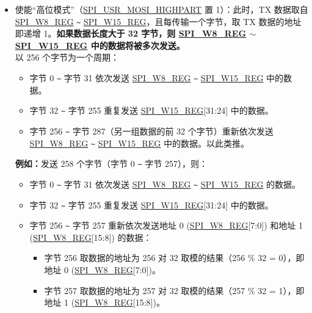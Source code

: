 \documentclass[main\_\_CN.tex]{subfiles}
\begin{document}
\begin{itemize}
\begin{itemize}
\begin{itemize}
\begin{itemize}
                    \item 字节 257 取数据的地址为 257 对 64 取模的结果（257 \% 64 = 1），即地址 1 (\hyperref[regdesc:SPIW0REG]{SPI\_W0\_REG}[15:8])。
                \end{itemize}
        \end{itemize}
        \item 使能“高位模式”（\hyperref[fielddesc:SPIUSRMOSIHIGHPART]{SPI\_USR\_MOSI\_HIGHPART} 置 1）：此时，TX 数据取自 \hyperref[regdesc:SPIW8REG]{SPI\_W8\_REG} \verb+~+ \hyperref[regdesc:SPIW15REG]{SPI\_W15\_REG}，且每传输一个字节，取 TX 数据的地址即递增 1。\textbf{如果数据长度大于 32 字节，则 \hyperref[regdesc:SPIW8REG]{SPI\_W8\_REG} $\sim$ \hyperref[regdesc:SPIW15REG]{SPI\_W15\_REG} 中的数据将被多次发送。}\\
        以 256 个字节为一个周期：
        \begin{itemize}
            \item 字节 0 \verb+~+ 字节 31 依次发送 \hyperref[regdesc:SPIW8REG]{SPI\_W8\_REG} \verb+~+ \hyperref[regdesc:SPIW15REG]{SPI\_W15\_REG} 中的数据。
            \item 字节 32 \verb+~+ 字节 255 重复发送 \hyperref[regdesc:SPIW15REG]{SPI\_W15\_REG}[31:24] 中的数据。
            \item 字节 256 \verb+~+ 字节 287（另一组数据的前 32 个字节）重新依次发送 \hyperref[regdesc:SPIW8REG]{SPI\_W8\_REG} \verb+~+ \hyperref[regdesc:SPIW15REG]{SPI\_W15\_REG} 中的数据。以此类推。
        \end{itemize}
        \textbf{例如：}发送 258 个字节（字节 0 \verb+~+ 字节 257），则：
        \begin{itemize}
            \item 字节 0 \verb+~+ 字节 31 依次发送 \hyperref[regdesc:SPIW8REG]{SPI\_W8\_REG} \verb+~+ \hyperref[regdesc:SPIW15REG]{SPI\_W15\_REG} 的数据。
            \item 字节 32 \verb+~+ 字节 255 重复发送 \hyperref[regdesc:SPIW15REG]{SPI\_W15\_REG}[31:24] 中的数据。
            \item 字节 256 \verb+~+ 字节 257 重新依次发送地址 0 (\hyperref[regdesc:SPIW8REG]{SPI\_W8\_REG}[7:0]) 和地址 1 (\hyperref[regdesc:SPIW8REG]{SPI\_W8\_REG}[15:8]) 的数据：
                \begin{itemize}
                    \item 字节 256 取数据的地址为 256 对 32 取模的结果（256 \% 32 = 0），即地址 0 (\hyperref[regdesc:SPIW8REG]{SPI\_W8\_REG}[7:0])。
                    \item 字节 257 取数据的地址为 257 对 32 取模的结果（257 \% 32 = 1），即地址 1 (\hyperref[regdesc:SPIW8REG]{SPI\_W8\_REG}[15:8])。
                \end{itemize}
        \end{itemize}


\end{itemize}
\end{itemize}
\end{document}
